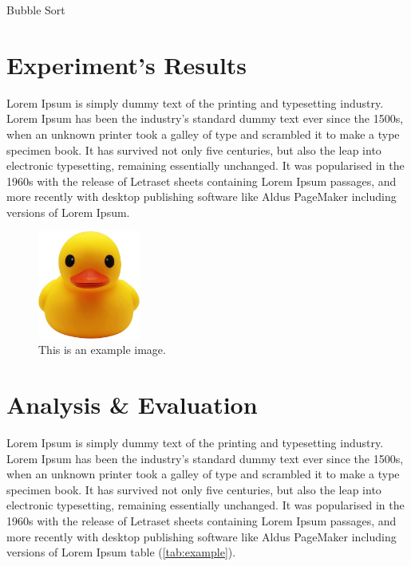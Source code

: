 \documentclass[12pt]{article}
\begin{document}
    \begin{algorithm}[!htb]
        \caption{Bubble Sort}\label{alg:bubble-sort}
    \end{algorithm}

    \newpage
    \section{Experiment's Results}
    Lorem Ipsum is simply dummy text of the printing and typesetting industry. Lorem Ipsum has been the industry's standard dummy text ever since the 1500s, when an unknown printer took a galley of type and scrambled it to make a type specimen book. It has survived not only five centuries, but also the leap into electronic typesetting, remaining essentially unchanged. It was popularised in the 1960s with the release of Letraset sheets containing Lorem Ipsum passages, and more recently with desktop publishing software like Aldus PageMaker including versions of Lorem Ipsum.

    \begin{figure}[!htb]
        \begin{center}
            \includegraphics[width=0.3\textwidth]{duck.jpg}
        \end{center}
        \caption{This is an example image.}
        \label{fig:duck}
    \end{figure}

    \newpage
    \section{Analysis \& Evaluation}
    Lorem Ipsum is simply dummy text of the printing and typesetting industry. Lorem Ipsum has been the industry's standard dummy text ever since the 1500s, when an unknown printer took a galley of type and scrambled it to make a type specimen book. It has survived not only five centuries, but also the leap into electronic typesetting, remaining essentially unchanged. It was popularised in the 1960s with the release of Letraset sheets containing Lorem Ipsum passages, and more recently with desktop publishing software like Aldus PageMaker including versions of Lorem Ipsum table (\ref{tab:example}).
\end{document}
